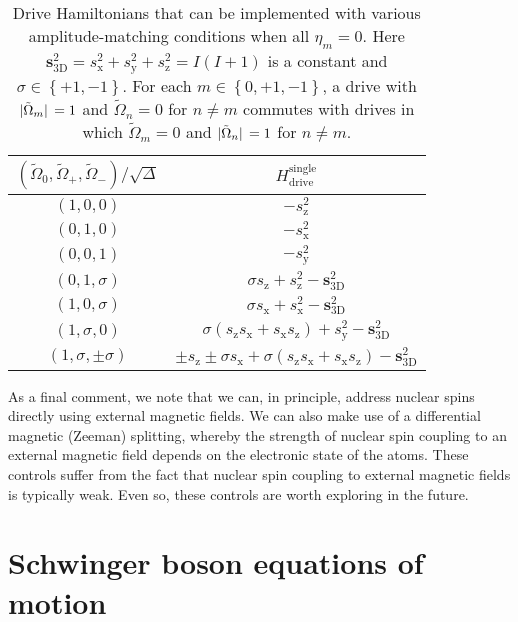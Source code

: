 \documentclass[nofootinbib,notitlepage,11pt]{revtex4-2}
\renewcommand{\t}{\text} %
\newcommand{\p}[1]{\left(#1\right)} %
\renewcommand{\set}[1]{\left\{#1\right\}} %
\renewcommand{\v}{\bm} %
\newcommand{\1}{\mathds{1}}
\newcommand{\x}{\text{x}}
\newcommand{\y}{\text{y}}
\newcommand{\z}{\text{z}}
\begin{document}
\begin{table}
  \centering
  \caption{Drive Hamiltonians that can be implemented with various amplitude-matching conditions when all $\eta_m=0$.
    Here $\v s_{\t{3D}}^2=s_\x^2+s_\y^2+s_\z^2=I\p{I+1}$ is a constant and $\sigma\in\set{+1,-1}$.  For each $m\in\set{0,+1,-1}$, a drive with $\abs*{\tilde\Omega_m}=1$ and $\tilde\Omega_n=0$ for $n\ne m$ commutes with drives in which $\tilde\Omega_m=0$ and $\abs*{\tilde\Omega_n}=1$ for $n\ne m$.}
  \begin{tabular}{c|c}
    $(\tilde\Omega_0,\tilde\Omega_+,\tilde\Omega_-)/\sqrt{\Delta}$
    & $H_{\t{drive}}^{\t{single}}$
    \\ \hline\hline
    $\p{1,0,0}$ & $-s_\z^2$
    \\ \hline
    $\p{0,1,0}$ & $-s_\x^2$
    \\ \hline
    $\p{0,0,1}$ & $-s_\y^2$
    \\ \hline
    $\p{0,1,\sigma}$ & $\sigma s_\z + s_\z^2 - \v s_{\t{3D}}^2$
    \\ \hline
    $\p{1,0,\sigma}$ & $\sigma s_\x + s_\x^2 - \v s_{\t{3D}}^2$
    \\ \hline
    $\p{1,\sigma,0}$
    & $\sigma\p{s_\z s_\x+s_\x s_\z} + s_\y^2 - \v s_{\t{3D}}^2$
    \\ \hline
    $\p{1,\sigma,\pm\sigma}$
    & $\pm s_\z \pm \sigma s_\x
    + \sigma \p{s_\z s_\x + s_\x s_\z} - \v s_{\t{3D}}^2$
  \end{tabular}
  \label{tab:drives}
\end{table}

As a final comment, we note that we can, in principle, address nuclear spins directly using external magnetic fields.
We can also make use of a differential magnetic (Zeeman) splitting, whereby the strength of nuclear spin coupling to an external magnetic field depends on the electronic state of the atoms.
These controls suffer from the fact that nuclear spin coupling to external magnetic fields is typically weak.
Even so, these controls are worth exploring in the future.

\section{Schwinger boson equations of motion}
\label{sec:bosons}
\end{document}
